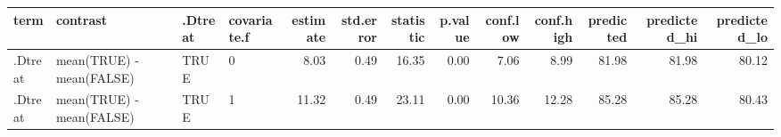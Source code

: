 \begin{table}[ht]
\centering
\begin{tabular}{llllrrrrrrrrr}
  \hline
term & contrast & .Dtreat & covariate.f & estimate & std.error & statistic & p.value & conf.low & conf.high & predicted & predicted\_hi & predicted\_lo \\ 
  \hline
.Dtreat & mean(TRUE) - mean(FALSE) & TRUE & 0 & 8.03 & 0.49 & 16.35 & 0.00 & 7.06 & 8.99 & 81.98 & 81.98 & 80.12 \\ 
  .Dtreat & mean(TRUE) - mean(FALSE) & TRUE & 1 & 11.32 & 0.49 & 23.11 & 0.00 & 10.36 & 12.28 & 85.28 & 85.28 & 80.43 \\ 
   \hline
\end{tabular}
\end{table}
